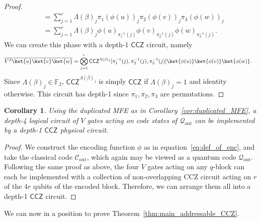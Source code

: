 \documentclass[11pt]{article}
\newtheorem{corollary}[theorem]{Corollary}
\theoremstyle{definition}
\newcommand{\CCZ}{\mathsf{CCZ}}
\newcommand{\qoutcode}{\mathcal{Q}_{\text{out}}}
\newcommand{\coutcode}{\mathcal{C}_{\text{out}}}
\newcommand{\enc}{\phi}
\newcommand{\FF}{\mathbb{F}}
\newcommand*{\ol}{\overline}
\begin{document}
\begin{proof}
\begin{align}
        &=  \sum_{j=1}^r \Lambda(\beta)_j 
        \pi_1(\enc(u))_j 
        \pi_2(\enc(v))_j 
        \pi_3(\enc(w))_j
         \\
         &=  \sum_{j=1}^r \Lambda(\beta)_j 
        \enc(u)_{\pi_1^{-1}(j)}
        \enc(v)_{\pi_2^{-1}(j)}
        \enc(w)_{\pi_3^{-1}(j)}.
    \end{align}
    We can create this phase with a depth-1 $\CCZ$ circuit, namely
    \begin{align}
        \ol{V^\beta\ket{u}\ket{v}\ket{w}}
        &= \bigotimes_{j=1}^r \CCZ^{\Lambda(\beta)_j}[\pi_1^{-1}(j), \pi_2^{-1}(j), \pi_3^{-1}(j)]\ket{\phi(u)}\ket{\phi(v)}\ket{\phi(w)}.
    \end{align}
    Since $\Lambda(\beta)_j \in \FF_2$, $\CCZ^{\Lambda(\beta)_j}$ is simply $\CCZ$ if $\Lambda(\beta)_j = 1$ and identity otherwise. 
    This circuit has depth-1 since $\pi_1,\pi_2,\pi_3$ are permutations.
\end{proof}
\begin{corollary}\label{cor:duplicated_qoutcode}
Using the duplicated MFE as in Corollary~\ref{cor:duplicated_MFE}, a depth-4 logical circuit of $V$ gates acting on code states of $\qoutcode$ can be implemented by a depth-1 $\CCZ$ physical circuit.
\end{corollary}
\begin{proof}
    We construct the encoding function $\phi$ as in equation~\eqref{eq:def_of_enc}, and take the classical code $\coutcode$, which again may be viewed as a quantum code $\qoutcode$. 
    Following the same proof as above, the four $V$ gates acting on any $q$-block can each be implemented with a collection of non-overlapping CCZ circuit acting on $r$ of the $4r$ qubits of the encoded block.
    Therefore, we can arrange them all into a depth-1 $\CCZ$ circuit.
\end{proof}

We can now in a position to prove Theorem~\ref{thm:main_addressable_CCZ}.
\end{document}
